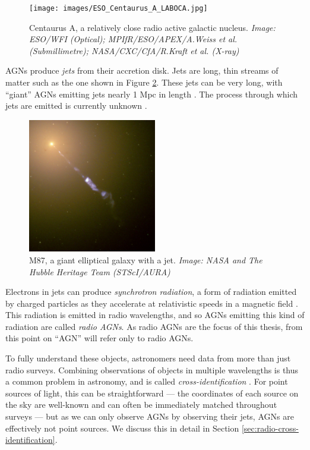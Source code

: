         \begin{figure}[!ht]
            \centering
            \texttt{[image: images/ESO\_Centaurus\_A\_LABOCA.jpg]}
            \caption{Centaurus A, a relatively close radio active galactic
                nucleus. \emph{Image: ESO/WFI (Optical); MPIfR/ESO/APEX/A.Weiss
                et al. (Submillimetre); NASA/CXC/CfA/R.Kraft et al. (X-ray)}}
            \label{fig:centaurus-a}
        \end{figure}

        AGNs produce \emph{jets} from their accretion disk. Jets are long, thin
        streams of matter such as the one shown in Figure \ref{fig:m87}. These
        jets can be very long, with ``giant'' AGNs emitting jets nearly 1 Mpc in
        length \citep{saripalli05}. The process through which jets are emitted
        is currently unknown \citeme.

        \begin{figure}[!ht]
            \centering
            \includegraphics[width=0.5\textwidth]{images/M87_jet.jpg}
            \caption{M87, a giant elliptical galaxy with a jet. \emph{Image:
                NASA and The Hubble Heritage Team (STScI/AURA)}}
            \label{fig:m87}
        \end{figure}

        Electrons in jets can produce \emph{synchrotron radiation}, a form of
        radiation emitted by charged particles as they accelerate at
        relativistic speeds in a magnetic field \citeme. This
        radiation is emitted in radio wavelengths, and so AGNs emitting this
        kind of radiation are called \emph{radio AGNs}. As radio AGNs are the
        focus of this thesis, from this point on ``AGN'' will refer only to
        radio AGNs.

        To fully understand these objects, astronomers need data from more than
        just radio surveys. Combining observations of objects in multiple
        wavelengths is thus a common problem in astronomy, and is called
        \emph{cross-identification} \citep{fan15}. For point sources of light,
        this can be straightforward --- the coordinates of each source on the
        sky are well-known and can often be immediately matched throughout
        surveys --- but as we can only observe AGNs by observing their jets,
        AGNs are effectively not point sources. We discuss this in detail in
        Section \ref{sec:radio-cross-identification}.

